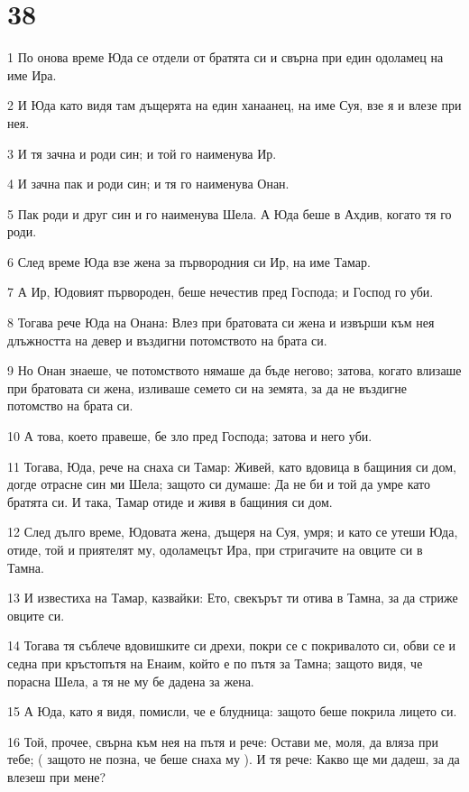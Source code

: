 \chapter{38}

\par 1 По онова време Юда се отдели от братята си и свърна при един одоламец на име Ира.
\par 2 И Юда като видя там дъщерята на един ханаанец, на име Суя, взе я и влезе при нея.
\par 3 И тя зачна и роди син; и той го наименува Ир.
\par 4 И зачна пак и роди син; и тя го наименува Онан.
\par 5 Пак роди и друг син и го наименува Шела. А Юда беше в Ахдив, когато тя го роди.
\par 6 След време Юда взе жена за първородния си Ир, на име Тамар.
\par 7 А Ир, Юдовият първороден, беше нечестив пред Господа; и Господ го уби.
\par 8 Тогава рече Юда на Онана: Влез при братовата си жена и извърши към нея длъжността на девер и въздигни потомството на брата си.
\par 9 Но Онан знаеше, че потомството нямаше да бъде негово; затова, когато влизаше при братовата си жена, изливаше семето си на земята, за да не въздигне потомство на брата си.
\par 10 А това, което правеше, бе зло пред Господа; затова и него уби.
\par 11 Тогава, Юда, рече на снаха си Тамар: Живей, като вдовица в бащиния си дом, догде отрасне син ми Шела; защото си думаше: Да не би и той да умре като братята си. И така, Тамар отиде и живя в бащиния си дом.
\par 12 След дълго време, Юдовата жена, дъщеря на Суя, умря; и като се утеши Юда, отиде, той и приятелят му, одоламецът Ира, при стригачите на овците си в Тамна.
\par 13 И известиха на Тамар, казвайки: Ето, свекърът ти отива в Тамна, за да стриже овците си.
\par 14 Тогава тя съблече вдовишките си дрехи, покри се с покривалото си, обви се и седна при кръстопътя на Енаим, който е по пътя за Тамна; защото видя, че порасна Шела, а тя не му бе дадена за жена.
\par 15 А Юда, като я видя, помисли, че е блудница: защото беше покрила лицето си.
\par 16 Той, прочее, свърна към нея на пътя и рече: Остави ме, моля, да вляза при тебе; ( защото не позна, че беше снаха му ). И тя рече: Какво ще ми дадеш, за да влезеш при мене?
